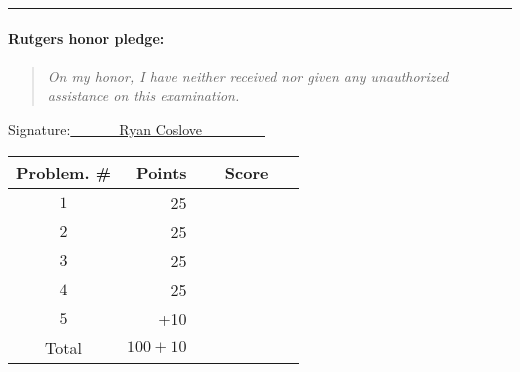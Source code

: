 \documentclass{article}
\theoremstyle{definition}
\def\fline{\rule{0.75\linewidth}{0.5pt}}
\newcommand{\finishline}{\vspace{-15pt}\begin{center}\fline\end{center}}
\begin{document}
\finishline

\paragraph{Rutgers honor pledge:} 

\begin{quote}
\emph{On my honor, I have neither received nor given any unauthorized assistance on this
examination.} 
\end{quote}
\hfill{Signature:\underline{~~~~~~~Ryan Coslove~~~~~~~~~}}

\bigskip

\begin{center}
\begin{tabular}{|c|r|c|}
\hline
Problem. \# & Points & Score \\ \hline\hline
$1$ & 25 & ~~~~~~~~~~~\\  \hline
$2$ & 25 & \\ \hline
$3$ & 25 & \\ \hline
$4$ & 25 & \\ \hline
$5$ & +10 & \\ \hline
Total & $100 + 10$ & \\ \hline
\end{tabular}
\end{center}

\newpage
\end{document}
